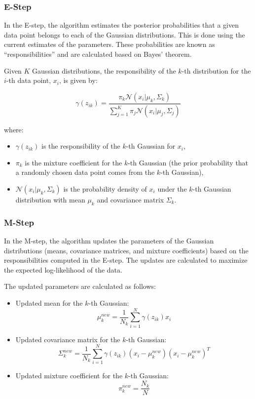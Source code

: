 \subsubsection{E-Step}

In the E-step, the algorithm estimates the posterior probabilities that a given data point belongs to each of the Gaussian distributions. This is done using the current estimates of the parameters. These probabilities are known as ``responsibilities'' and are calculated based on Bayes' theorem.

Given \(K\) Gaussian distributions, the responsibility of the \(k\)-th distribution for the \(i\)-th data point, \(x_i\), is given by:

\[
\gamma(z_{ik}) = \frac{\pi_k \mathcal{N}(x_i | \mu_k, \Sigma_k)}{\sum_{j=1}^{K} \pi_j \mathcal{N}(x_i | \mu_j, \Sigma_j)}
\]

where:
\begin{itemize}
    \item \(\gamma(z_{ik})\) is the responsibility of the \(k\)-th Gaussian for \(x_i\),
    \item \(\pi_k\) is the mixture coefficient for the \(k\)-th Gaussian (the prior probability that a randomly chosen data point comes from the \(k\)-th Gaussian),
    \item \(\mathcal{N}(x_i | \mu_k, \Sigma_k)\) is the probability density of \(x_i\) under the \(k\)-th Gaussian distribution with mean \(\mu_k\) and covariance matrix \(\Sigma_k\).
\end{itemize}

\subsubsection{M-Step}

In the M-step, the algorithm updates the parameters of the Gaussian distributions (means, covariance matrices, and mixture coefficients) based on the responsibilities computed in the E-step. The updates are calculated to maximize the expected log-likelihood of the data.

The updated parameters are calculated as follows:

\begin{itemize}
    \item Updated mean for the \(k\)-th Gaussian:
    \[
    \mu_k^{new} = \frac{1}{N_k} \sum_{i=1}^{N} \gamma(z_{ik}) x_i
    \]
    
    \item Updated covariance matrix for the \(k\)-th Gaussian:
    \[
    \Sigma_k^{new} = \frac{1}{N_k} \sum_{i=1}^{N} \gamma(z_{ik}) (x_i - \mu_k^{new})(x_i - \mu_k^{new})^T
    \]
    
    \item Updated mixture coefficient for the \(k\)-th Gaussian:
    \[
    \pi_k^{new} = \frac{N_k}{N}
    \]
\end{itemize}


